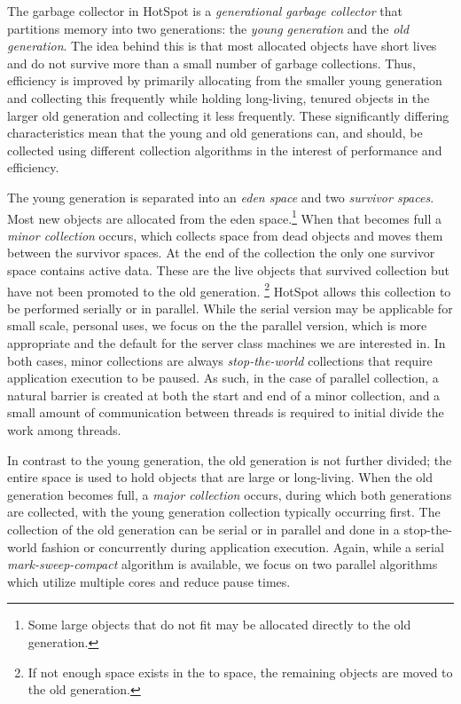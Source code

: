 \documentclass{sig-alternate}
\begin{document}
The garbage collector in HotSpot is a \textit{generational garbage collector}\cite{hotspot:memory} that partitions memory into two generations: the \textit{young generation} and the \textit{old generation}. The idea behind this is that most allocated objects have short lives and do not survive more than a small number of garbage collections. Thus, efficiency is improved by primarily allocating from the smaller young generation and collecting this frequently while holding long-living, tenured objects in the larger old generation and collecting it less frequently. These significantly differing characteristics mean that the young and old generations can, and should, be collected using different collection algorithms in the interest of performance and efficiency.

The young generation is separated into an \textit{eden space} and two \textit{survivor spaces}. Most new objects are allocated from the eden space.\footnote{Some large objects that do not fit may be allocated directly to the old generation.} When that becomes full a \textit{minor collection} occurs, which collects space from dead objects and moves them between the survivor spaces. At the end of the collection the only one survivor space contains active data. These are the live objects that survived collection but have not been promoted to the old generation. \footnote{If not enough space exists in the to space, the remaining objects are moved to the old generation.} HotSpot allows this collection to be performed serially or in parallel. While the serial version may be applicable for small scale, personal uses, we focus on the the parallel version, which is more appropriate and the default for the server class machines we are interested in. In both cases, minor collections are always \textit{stop-the-world} collections that require application execution to be paused. As such, in the case of parallel collection, a natural barrier is created at both the start and end of a minor collection, and a small amount of communication between threads is required to initial divide the work among threads.

In contrast to the young generation, the old generation is not further divided; the entire space is used to hold objects that are large or long-living. When the old generation becomes full, a \textit{major collection} occurs, during which both generations are collected, with the young generation collection typically occurring first. The collection of the old generation can be serial or in parallel and done in a stop-the-world fashion or concurrently during application execution. Again, while a serial \textit{mark-sweep-compact} algorithm is available, we focus on two parallel algorithms which utilize multiple cores and reduce pause times.
\end{document}
